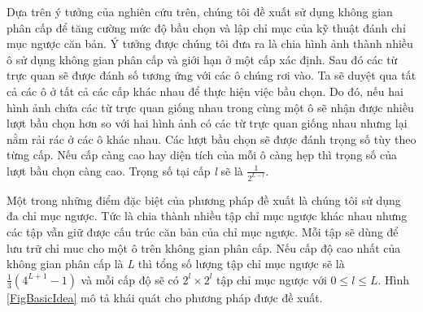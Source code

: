 Dựa trên ý tưởng của nghiên cứu trên, chúng tôi đề xuất sử dụng không gian phân cấp để tăng cường mức độ bầu chọn và lập chỉ mục của kỹ thuật đánh chỉ mục ngược căn bản. Ý tưởng được chúng tôi đưa ra là chia hình ảnh thành nhiều ô sử dụng không gian phân cấp và giới hạn ở một cấp xác định. Sau đó các từ trực quan sẽ được đánh số tương ứng với các ô chúng rơi vào. Ta sẽ duyệt qua tất cả các ô ở tất cả các cấp khác nhau để thực hiện việc bầu chọn. Do đó, nếu hai hình ảnh chứa các từ trực quan giống nhau trong cùng một ô sẽ nhận được nhiều lượt bầu chọn hơn so với hai hình ảnh có các từ trực quan giống nhau nhưng lại nằm rải rác ở các ô khác nhau. Các lượt bầu chọn sẽ được đánh trọng số tùy theo từng cấp. Nếu cấp càng cao hay diện tích của mỗi ô càng hẹp thì trọng số của lượt bầu chọn càng cao. Trọng số tại cấp \textit{l} sẽ là $\frac{1}{2^{L-l}}$.

Một trong những điểm đặc biệt của phương pháp đề xuất là chúng tôi sử dụng đa chỉ mục ngược. Tức là chia thành nhiều tập chỉ mục ngược khác nhau nhưng các tập vẫn giữ được cấu trúc căn bản của chỉ mục ngược. Mỗi tập sẽ dùng để lưu trữ chỉ muc cho một ô trên không gian phân cấp. Nếu cấp độ cao nhất của không gian phân cấp là \textit{L} thì tổng số lượng tập chỉ mục ngược sẽ là $\frac{1}{3}(4^{L+1} - 1)$ và mỗi cấp độ sẽ có $2^l \times 2^l$ tập chỉ mục ngược với $0 \leq l \leq L$. Hình \ref{FigBasicIdea} mô tả khái quát cho phương pháp được đề xuất.

